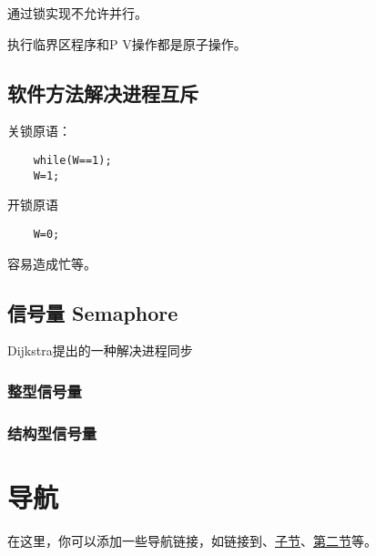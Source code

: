 \documentclass{ctexart}
\begin{document}
通过锁实现不允许并行。

执行临界区程序和P V操作都是原子操作。

\subsection{软件方法解决进程互斥}

关锁原语：
\begin{lstlisting}
    while(W==1);
    W=1;
\end{lstlisting}
开锁原语
\begin{lstlisting}
    W=0;
\end{lstlisting}

容易造成忙等。

\subsection{信号量 Semaphore}
Dijkstra提出的一种解决进程同步
\subsubsection{整型信号量}

\subsubsection{结构型信号量}

\clearpage

\section*{导航}
\label{sec:navigation}

在这里，你可以添加一些导航链接，如链接到、\hyperref[subsec:sub]{子节}、\hyperref[sec:second]{第二节}等。
\end{document}
